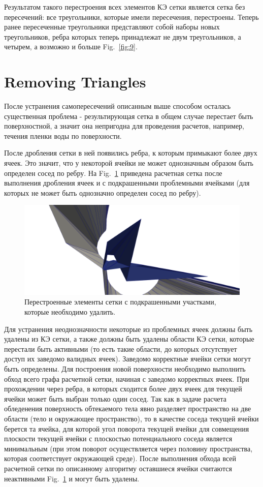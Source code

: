 \documentclass[
11pt,%
tightenlines,%
twoside,%
onecolumn,%
nofloats,%
nobibnotes,%
nofootinbib,%
superscriptaddress,%
noshowpacs,%
centertags]%
{revtex4}
\begin{document}
Результатом такого перестроения всех элементов КЭ сетки является сетка без пересечений: все треугольники, которые имели пересечения, перестроены. Теперь ранее пересеченные треугольники представляют собой наборы новых треугольников, ребра которых теперь принадлежат не двум треугольников, а четырем, а возможно и больше Fig.~\ref{fig:9}.

\section{Removing Triangles}

После устранения самопересечений описанным выше способом осталась существенная проблема - результирующая сетка в общем случае перестает быть поверхностной, а значит она непригодна для проведения расчетов, например, течения пленки воды по поверхности.

После дробления сетки в ней появились ребра, к которым примыкают более двух ячеек. Это значит, что у некоторой ячейки не может однозначным образом быть определен сосед по ребру. На Fig.~\ref{fig:10} приведена расчетная сетка после выполнения дробления ячеек и с подкрашенными проблемными ячейками (для которых не может быть однозначно определен сосед по ребру).

\begin{figure}[h]
\includegraphics[width=1.0\textwidth]{pics/pic_10.png}
\caption{Перестроенные элементы сетки с подкрашенными участками, которые необходимо удалить.}\label{fig:10}
\end{figure}

Для устранения неоднозначности некоторые из проблемных ячеек должны быть удалены из КЭ сетки, а также должны быть удалены области КЭ сетки, которые перестали быть активными (то есть такие области, до которых отсутствует доступ их заведомо валидных ячеек). Заведомо корректные ячейки сетки могут быть определены. Для построения новой поверхности необходимо выполнить обход всего графа расчетной сетки, начиная с заведомо корректных ячеек. При прохождении через ребра, в которых сходится более двух ячеек для текущей ячейки может быть выбран только один сосед. Так как в задаче расчета обледенения поверхность обтекаемого тела явно разделяет пространство на две области (тело и окружающее пространство), то в качестве соседа текущей ячейки берется та ячейка, для которой угол поворота текущей ячейки для совмещения плоскости текущей ячейки с плоскостью потенциального соседа является минимальным (при этом поворот осуществляется через половину пространства, которая соответствует окружающей среде). После выполнения обхода всей расчетной сетки по описанному алгоритму оставшиеся ячейки считаются неактивными Fig.~\ref{fig:10} и могут быть удалены.
\end{document}
